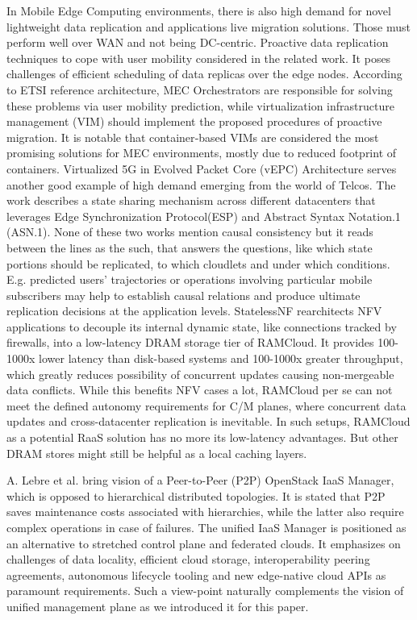 \documentclass[conference]{IEEEtran}
\begin{document}
In Mobile Edge Computing environments, there is also high demand for novel
lightweight data replication and applications live migration solutions. Those
must perform well over WAN and not being DC-centric. Proactive data replication
techniques to cope with user mobility considered in the related work\cite{b14}.
It poses challenges of efficient scheduling of data replicas over the edge
nodes. According to ETSI reference architecture, MEC Orchestrators are
responsible for solving these problems via user mobility prediction, while
virtualization infrastructure management (VIM) should implement the proposed
procedures of proactive migration. It is notable that container‐based VIMs are
considered the most promising solutions for MEC environments, mostly due to
reduced footprint of containers. Virtualized 5G in Evolved Packet Core (vEPC)
Architecture\cite{b15} serves another good example of high demand emerging
from the world of Telcos. The work describes a state sharing mechanism across
different datacenters that leverages Edge Synchronization Protocol(ESP) and
Abstract Syntax Notation.1 (ASN.1). None of these two works mention
causal consistency but it reads between the lines as the such, that answers the
questions, like which state portions should be replicated, to which cloudlets
and under which conditions. E.g. predicted users' trajectories or operations
involving particular mobile subscribers may help to establish causal relations
and produce ultimate replication decisions at the application levels.
StatelessNF\cite{b16} rearchitects NFV applications to decouple its internal
dynamic state, like connections tracked by firewalls, into a low-latency DRAM
storage tier of RAMCloud\cite{b18}. It provides 100-1000x lower latency than
disk-based systems and 100-1000x greater throughput, which greatly reduces
possibility of concurrent updates causing non-mergeable data conflicts. While
this benefits NFV cases a lot, RAMCloud per se can not meet the defined autonomy
requirements for C/M planes, where concurrent data updates and cross-datacenter
replication is inevitable. In such setups, RAMCloud as a potential RaaS
solution has no more its low-latency advantages. But other DRAM stores might
still be helpful as a local caching layers.

A. Lebre et al.\cite{b9} bring vision of a Peer-to-Peer (P2P) OpenStack IaaS
Manager, which is opposed to hierarchical distributed topologies. It is stated
that P2P saves maintenance costs associated with hierarchies, while the latter
also require complex operations in case of failures. The unified IaaS Manager
is positioned as an alternative to stretched control plane and federated
clouds. It emphasizes on challenges of data locality, efficient cloud storage,
interoperability peering agreements, autonomous lifecycle tooling and new
edge-native cloud APIs as paramount requirements. Such a view-point naturally
complements the vision of unified management plane as we introduced it for this
paper.
\end{document}
